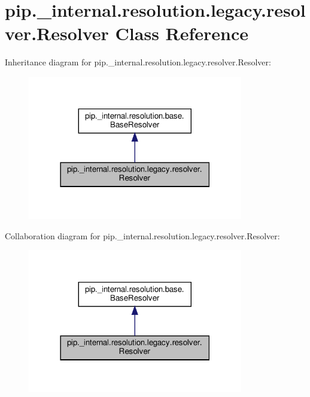 \hypertarget{classpip_1_1__internal_1_1resolution_1_1legacy_1_1resolver_1_1Resolver}{}\section{pip.\+\_\+internal.\+resolution.\+legacy.\+resolver.\+Resolver Class Reference}
\label{classpip_1_1__internal_1_1resolution_1_1legacy_1_1resolver_1_1Resolver}


Inheritance diagram for pip.\+\_\+internal.\+resolution.\+legacy.\+resolver.\+Resolver\+:
\nopagebreak
\begin{figure}[H]
\begin{center}
\leavevmode
\includegraphics[width=266pt]{classpip_1_1__internal_1_1resolution_1_1legacy_1_1resolver_1_1Resolver__inherit__graph}
\end{center}
\end{figure}


Collaboration diagram for pip.\+\_\+internal.\+resolution.\+legacy.\+resolver.\+Resolver\+:
\nopagebreak
\begin{figure}[H]
\begin{center}
\leavevmode
\includegraphics[width=266pt]{classpip_1_1__internal_1_1resolution_1_1legacy_1_1resolver_1_1Resolver__coll__graph}
\end{center}
\end{figure}

